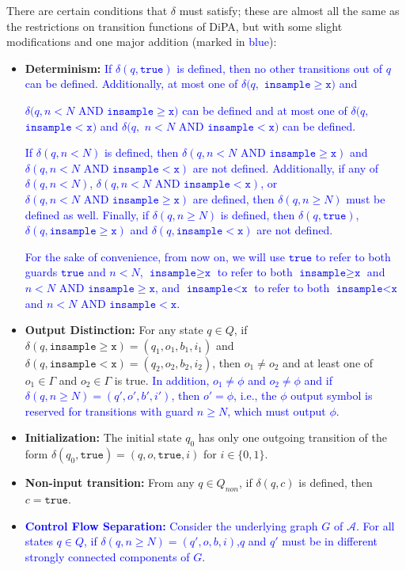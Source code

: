 \documentclass[12pt]{article}
\newcommand{\gguard}{\texttt{insample}\geq \texttt{x}}
\newcommand{\lguard}{\texttt{insample} < \texttt{x}}
\newcommand{\gaguard}{n<N \text{ AND } \texttt{insample} \geq \texttt{x}}
\newcommand{\laguard}{n<N\text{ AND }\texttt{insample} < \texttt{x}}
\theoremstyle{definition}
\begin{document}
There are certain conditions that $\delta$ must satisfy; these are almost all the same as the restrictions on transition functions of DiPA, but with some slight modifications and one major addition (marked in \textcolor{blue}{blue}):
\begin{itemize}
	\item \textbf{Determinism:} 
	\textcolor{blue}{If $\delta(q, \texttt{true})$ is defined, then no other transitions out of $q$ can be defined. Additionally, at most one of $\delta(q,$ $\gguard)$ and }
	
	\textcolor{blue}{$\delta(q,$$\gaguard)$ can be defined and at most one of $\delta(q,$ $\lguard)$ and $\delta(q,$ $\laguard)$ can be defined.} 
	
	\textcolor{blue}{If $\delta(q, n<N)$ is defined, then $\delta(q, \gaguard)$ and\\$\delta(q, \laguard)$ are not defined. Additionally, if any of $\delta(q, n<N)$, $\delta(q, \laguard)$, or $\delta(q, \gaguard)$ are defined, then $\delta(q, n \geq N)$ must be defined as well. 
	Finally, if $\delta(q, n\geq N)$ is defined, then $\delta(q, \texttt{true})$, $\delta(q, \gguard)$ and $\delta(q, \lguard)$ are not defined.} 

	\textcolor{blue}{For the sake of convenience, from now on, we will use $\texttt{true}$ to refer to both guards $\texttt{true}$ and $n < N$, $\gguard$ to refer to both $\gguard$ and $\gaguard$, and $\lguard$ to refer to both $\lguard$ and $\laguard$.}

	\item \textbf{Output Distinction:} For any state $q\in Q$, if $\delta(q, \gguard) = (q_1, o_1, b_1, i_1)$ and $\delta(q, \lguard) = (q_2, o_2, b_2, i_2)$, then $o_1\neq o_2$ and at least one of $o_1\in \Gamma$ and $o_2\in \Gamma$ is true. \textcolor{blue}{In addition, $o_1\neq \phi$ and $o_2\neq \phi$ and if $\delta(q, n\geq N) = (q', o', b', i')$, then $o' = \phi$, i.e., the $\phi$ output symbol is reserved for transitions with guard $n\geq N$, which must output $\phi$}.

	\item \textbf{Initialization:} The initial state $q_0$ has only one outgoing transition of the form $\delta(q_0, \texttt{true}) = (q, o, \texttt{true}, i)$ for $i\in \{0, 1\}$.

	\item \textbf{Non-input transition:} From any $q\in Q_{non}$, if $\delta(q, c)$ is defined, then $c=\texttt{true}$.

	\item \textcolor{blue}{\textbf{Control Flow Separation:} Consider the underlying graph $G$ of $\mathcal{A}$. For all states $q\in Q$, if $\delta(q, n\geq N) = (q', o, b, i)$,$q$ and $q'$ must be in different strongly connected components of $G$}.

\end{itemize}
\end{document}
